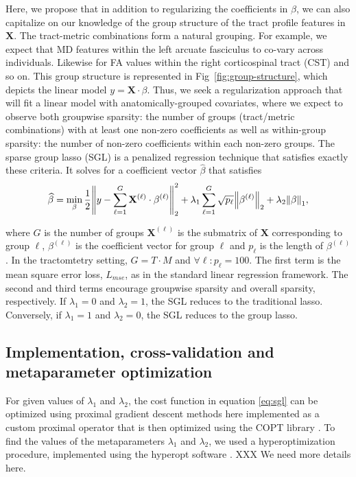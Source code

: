 Here, we propose that in addition to regularizing the coefficients in $\beta$,
we can also capitalize on our knowledge of the group structure of the tract
profile features in $\mathbf{X}$. The tract-metric combinations form a natural
grouping. For example, we expect that MD features within the left arcuate
fasciculus to co-vary across individuals. Likewise for FA values within the
right corticospinal tract (CST) and so on. This group structure is represented
in Fig~\ref{fig:group-structure}, which depicts the linear model $y = \mathbf{X}
\cdot \beta$. Thus, we seek a regularization approach that will fit a linear
model with anatomically-grouped covariates, where we expect to observe both
groupwise sparsity: the number of groups (tract/metric combinations) with at
least one non-zero coefficients as well as within-group sparsity: the number of
non-zero coefficients within each non-zero groups. The sparse group lasso (SGL)
is a penalized regression technique that satisfies exactly these
criteria\cite{simon2013sparse}. It solves for a coefficient vector
$\widehat{\beta}$ that satisfies
\begin{equation}
    \widehat{\beta} = \min_\beta \frac{1}{2}
    \norm*{y - \displaystyle \sum_{\ell = 1}^{G} \mathbf{X}^{(\ell)} \cdot \beta^{(\ell)}}_2^2
    + \lambda_1 \displaystyle \sum_{\ell = 1}^{G} \sqrt{p_\ell} \norm*{\beta^{(\ell)}}_2
    + \lambda_2 \norm*{\beta}_1,
    \label{eq:sgl}
\end{equation}

where $G$ is the number of groups $\mathbf{X}^{(\ell)}$ is the submatrix of
$\mathbf{X}$ corresponding to group $\ell$, $\beta^{(\ell)}$ is the coefficient
vector for group $\ell$ and $p_\ell$ is the length of $\beta^{(\ell)}$. In the
tractomtetry setting, $G = T \cdot M$ and $\forall \ell: p_\ell = 100$. The
first term is the mean square error loss, $L_{mse}$, as in the standard linear
regression framework. The second and third terms encourage groupwise sparsity
and overall sparsity, respectively. If $\lambda_1 = 0$ and $\lambda_2 = 1$, the
SGL reduces to the traditional lasso\cite{tibshirani1996regression}. Conversely,
if $\lambda_1 = 1$ and $\lambda_2 = 0$, the SGL reduces to the group
lasso\cite{yuan2006model}.

\subsection*{Implementation, cross-validation and metaparameter optimization}

For given values of $\lambda_1$ and $\lambda_2$, the cost function in equation
\ref{eq:sgl} can be optimized using proximal gradient descent methods
\cite{parikh2014proximal} here implemented as a custom proximal operator that is
then optimized using the COPT library . To
find the values of the metaparameters $\lambda_1$ and $\lambda_2$, we used a
hyperoptimization procedure, implemented using the hyperopt software
\cite{Bergstra_2015}. XXX We need more details here.

